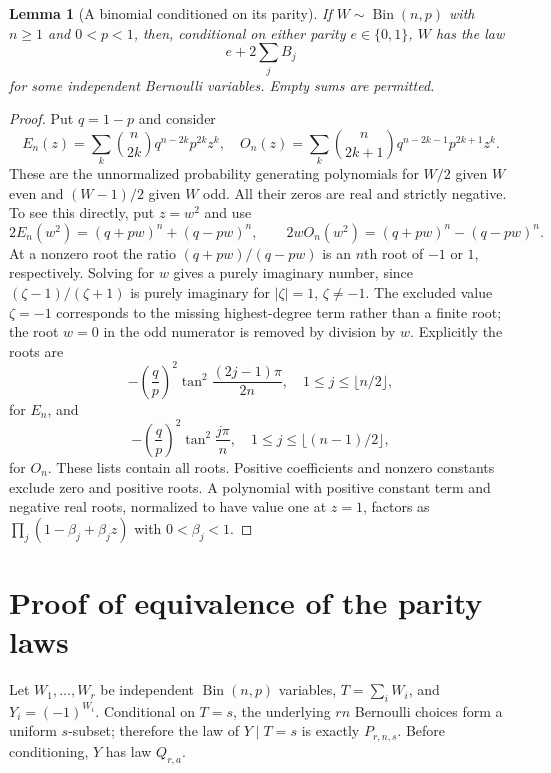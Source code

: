 \documentclass[11pt]{article}
\newtheorem{lemma}[theorem]{Lemma}
\begin{document}
\begin{lemma}[A binomial conditioned on its parity]\label{lem:roots}
If $W\sim\operatorname{Bin}(n,p)$ with $n\ge1$ and $0<p<1$, then, conditional on either
parity $e\in\{0,1\}$, $W$ has the law
\[
 e+2\sum_j B_j
\]
for some independent Bernoulli variables. Empty sums are permitted.
\end{lemma}

\begin{proof}
Put $q=1-p$ and consider
\[
 E_n(z)=\sum_k\binom n{2k}q^{n-2k}p^{2k}z^k,
 \quad
 O_n(z)=\sum_k\binom n{2k+1}q^{n-2k-1}p^{2k+1}z^k.
\]
These are the unnormalized probability generating polynomials for $W/2$
given $W$ even and $(W-1)/2$ given $W$ odd. All their zeros are real and
strictly negative. To see this directly, put $z=w^2$ and use
\[
 2E_n(w^2)=(q+pw)^n+(q-pw)^n,
 \qquad
 2wO_n(w^2)=(q+pw)^n-(q-pw)^n.
\]
At a nonzero root the ratio $(q+pw)/(q-pw)$ is an $n$th root of $-1$ or
$1$, respectively. Solving for $w$ gives a purely imaginary number, since
$(\zeta-1)/(\zeta+1)$ is purely imaginary for $|\zeta|=1$, $\zeta\ne-1$.
The excluded value $\zeta=-1$ corresponds to the missing highest-degree
term rather than a finite root; the root $w=0$ in the odd numerator is
removed by division by $w$. Explicitly the roots are
\[
 -\left(\frac qp\right)^2\tan^2\frac{(2j-1)\pi}{2n},
 \quad 1\le j\le\lfloor n/2\rfloor,
\]
for $E_n$, and
\[
 -\left(\frac qp\right)^2\tan^2\frac{j\pi}{n},
 \quad 1\le j\le\lfloor(n-1)/2\rfloor,
\]
for $O_n$. These lists contain all roots. Positive coefficients and nonzero constants exclude
zero and positive roots. A polynomial with positive constant term and
negative real roots, normalized to have value one at $z=1$, factors as
$\prod_j(1-\beta_j+\beta_j z)$ with $0<\beta_j<1$.
\end{proof}

\section{Proof of equivalence of the parity laws}

Let $W_1,\ldots,W_r$ be independent $\operatorname{Bin}(n,p)$ variables,
$T=\sum_iW_i$, and $Y_i=(-1)^{W_i}$. Conditional on $T=s$, the underlying
$rn$ Bernoulli choices form a uniform $s$-subset; therefore the law of
$Y\mid T=s$ is exactly $P_{r,n,s}$. Before conditioning, $Y$ has law
$Q_{r,a}$.
\end{document}
